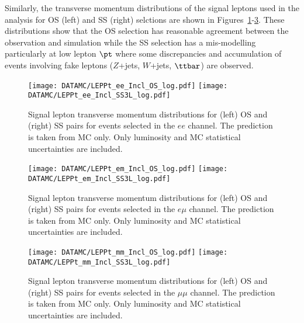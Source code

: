 Similarly, the transverse momentum distributions of the signal leptons used in the analysis for OS (left) and SS (right) selctions are shown in 
Figures~\ref{fig:dataMC_lep1.ee}-\ref{fig:dataMC_lep1.mm}. These distributions show that the OS selection has reasonable agreement between the observation 
and simulation while the SS selection has a mis-modelling particularly at low
lepton $\pt$ where some discrepancies and accumulation of events involving fake leptons ($Z$+jets, $W$+jets, $\ttbar$) are observed. 
 \begin{figure}[htb!]
 \centering
 {\texttt{[image: DATAMC/LEPPt\_ee\_Incl\_OS\_log.pdf]}}
 {\texttt{[image: DATAMC/LEPPt\_ee\_Incl\_SS3L\_log.pdf]}}
\caption{Signal lepton transverse momentum distributions for (left) OS and (right) SS  pairs for events selected in the $ee$ channel.  
The prediction is taken from MC only.
Only luminosity and MC statistical uncertainties are included.
}
\label{fig:dataMC_lep1.ee}
\end{figure}
 \begin{figure}[htb!]
 \centering
{\texttt{[image: DATAMC/LEPPt\_em\_Incl\_OS\_log.pdf]}}
{\texttt{[image: DATAMC/LEPPt\_em\_Incl\_SS3L\_log.pdf]}}
\caption{Signal lepton transverse momentum distributions for (left) OS and (right) SS  pairs for events selected in the $e\mu$ channel.
The prediction is taken from MC only.
Only luminosity and MC statistical uncertainties are included.
}
\label{fig:dataMC_lep1.em}
\end{figure}
 \begin{figure}[htb!]
 \centering
{\texttt{[image: DATAMC/LEPPt\_mm\_Incl\_OS\_log.pdf]}}
{\texttt{[image: DATAMC/LEPPt\_mm\_Incl\_SS3L\_log.pdf]}}
\caption{Signal lepton transverse momentum distributions for (left) OS and (right) SS pairs for events selected in the $\mu\mu$ channel.  
The prediction is taken from MC only.
Only luminosity and MC statistical uncertainties are included.
}
\label{fig:dataMC_lep1.mm}
\end{figure}

